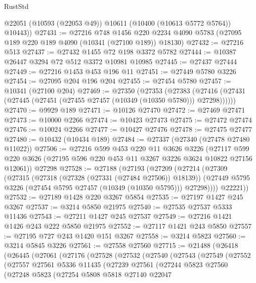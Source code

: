 \begin{lexlean}{RustStd}
\begin{coremodule}
        @22051
        (@10593 (@22053 @49))
        @10611
        (@10400 (@10613 @5772 @5764))
        @10443))
@27431 := @27216
    @748
    @1456
    @220
    @2234
    @4090
    @5783
    (@27095 @189 @220 @189 @4090 (@10341 (@27100 @189)) @18130)
@27432 := @27216 @513
@27437 := @27432 @1455 @72 @198 @3372 @5782
@27444 := @10387 @26447 @3294 @72 @512 @3372 @10981 @10985
@27445 := @27437 @27444
@27449 := @27216 @1453 @453 @196 @11
@27451 := @27449 @5780 @3226
@27454 := @27095 @204 @196 @204
@27455 := @27454 @5780
@27457 := @10341 (@27100 @204)
@27469 := @27350
    (@27353
      (@27383 (@27416 (@27431 (@27445 (@27451 (@27455 @27457 (@10349 (@10350 @5780))) @27298))))))
@27470 := @9929 @189
@27471 := @10126 @27470
@27472 := @27469 @27471
@27473 := @10000 @2266
@27474 := @10423 @27473
@27475 := @27472 @27474
@27476 := @10024 @2266
@27477 := @10427 @27476
@27478 := @27475 @27477
@27480 := @10432 (@10434 @189)
@27484 := @27337 (@27340 (@27478 @27480 @11022))
@27506 := @27216
    @599
    @453
    @220
    @11
    @3626
    @3226
    (@27117 @599 @220 @3626 (@27195 @596 @220 @453 @11 @3267 @3226 @3624 @10822 @27156 @12061))
    @27298
@27528 := @27188
    (@27193
      (@27209
        (@27214
          (@27309
            (@27315
              (@27318 (@27328 (@27331 (@27484 @27506)) @18139))
              (@27449 @5795 @3226 (@27454 @5795 @27457 (@10349 (@10350 @5795))) @27298))))
        @22221))
@27532 := @27189 @1428 @220 @3267 @5854
@27535 := @27197 @1427 @245 @3267
@27537 := @3214 @5850 @21975
@27540 := @27535 @27537 @5333 @11436
@27543 := @27211 @1427 @245 @27537
@27549 := @27216 @1421 @1426 @243 @222 @5850 @21975
@27552 := @27117 @1421 @243 @5850
@27557 := @27195 @727 @243 @1420 @151 @3267
@27558 := @3214 @5823
@27560 := @3214 @5845 @3226
@27561 := @27558 @27560
@27715 := @21488
    (@26418
      (@26445
        (@27061
          (@27176
            (@27528
              (@27532
                (@27540
                  (@27543
                    (@27549
                      (@27552
                        (@27557
                          @27561
                          @5336
                          @11435
                          (@27239
                            @27561
                            (@27244
                              @5823
                              @27560
                              (@27248
                                @5823
                                (@27254
                                  @5808
                                  @5818
                                  @27140
                                  @22047

\end{coremodule}
\end{lexlean}
